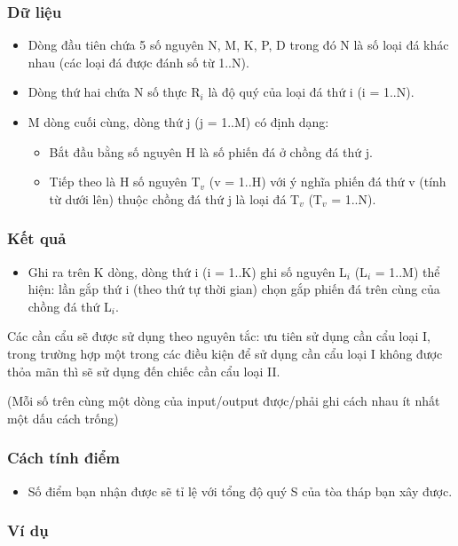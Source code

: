 \subsubsection{Dữ liệu}
\begin{itemize}
	\item Dòng đầu tiên chứa 5 số nguyên N, M, K, P, D trong đó N là số loại đá khác nhau (các loại đá được đánh số từ 1..N).
	\item Dòng thứ hai chứa N số thực R$_i$ là độ quý của loại đá thứ i (i = 1..N).
	\item M dòng cuối cùng, dòng thứ j (j = 1..M) có định dạng:                       

 
\begin{itemize}
	\item Bắt đầu bằng số nguyên H là số phiến đá ở chồng đá thứ j.
	\item Tiếp theo là H số nguyên T$_v$ (v = 1..H) với ý nghĩa phiến đá thứ v (tính từ dưới lên) thuộc chồng đá thứ j là loại đá T$_v$ (T$_v$ = 1..N).
\end{itemize}
\end{itemize}

\subsubsection{Kết quả}
\begin{itemize}
	\item Ghi ra trên K dòng, dòng thứ i (i = 1..K) ghi số nguyên L$_i$ (L$_i$ = 1..M) thể hiện: lần gắp thứ i (theo thứ tự thời gian) chọn gắp phiến đá trên cùng của chồng đá thứ L$_i$.
\end{itemize}

Các cần cẩu sẽ được sử dụng theo nguyên tắc: ưu tiên sử dụng cần cẩu loại I, trong trường hợp một trong các điều kiện để sử dụng cần cẩu loại I không được thỏa mãn thì sẽ sử dụng đến chiếc cần cẩu loại II.

(Mỗi số trên cùng một dòng của input/output được/phải ghi cách nhau ít nhất một dấu cách trống)

\subsubsection{Cách tính điểm}
\begin{itemize}
	\item Số điểm bạn nhận được sẽ tỉ lệ với tổng độ quý S của tòa tháp bạn xây được.
\end{itemize}

\subsubsection{Ví dụ}


